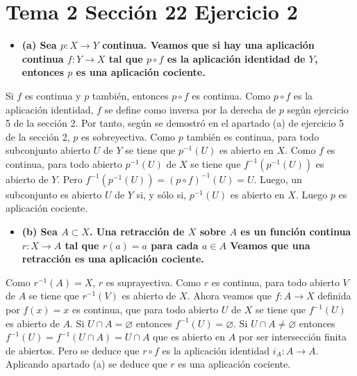 \documentclass{article}
\begin{document}
\section{Tema 2 Sección 22 Ejercicio 2}
\begin{itemize}
\item \bf (a) \rm Sea $p:X\rightarrow Y$ continua. Veamos que si hay una aplicación continua $f:Y\rightarrow X$ tal que $p\circ f$ es la aplicación identidad de $Y$, entonces $p$ es una aplicación cociente.
\end{itemize}
Si $f$ es continua y $p$ también, entonces $p\circ f$ es continua. Como $p\circ f$ es la aplicación identidad, $f$ se define como inversa por la derecha de $p$ según ejercicio 5 de la sección 2. Por tanto, según se demostró en el apartado (a) de ejercicio 5 de la sección 2, $p$ es sobreyectiva. Como $p$ también es continua, para todo subconjunto abierto $U$ de $Y$ se tiene que $p^{-1}(U)$ es abierto en $X$. Como $f$ es continua, para todo abierto $p^{-1}(U)$ de $X$ se tiene que $f^{-1}(p^{-1}(U))$ es abierto de $Y$. Pero $f^{-1}(p^{-1}(U))=(p\circ f)^{-1}(U)=U$. Luego, un subconjunto es abierto $U$ de $Y$ si, y sólo si, $p^{-1}(U)$ es abierto en $X$. Luego $p$ es aplicación cociente.
\begin{itemize}
\item \bf (b) \rm Sea $A\subset X$. Una retracción de $X$ sobre $A$ es un función continua $r:X\rightarrow A$ tal que $r(a)=a$ para cada $a\in A$ Veamos que una retracción es una aplicación cociente.
\end{itemize}
Como $r^{-1}(A)=X$, $r$ es suprayectiva. Como $r$ es continua, para todo abierto $V$ de $A$ se tiene que $r^{-1}(V)$ es abierto de $X$. Ahora veamos que $f:A\rightarrow X$ definida por $f(x)=x$ es continua, que para todo abierto $U$  de $X$ se tiene que $f^{-1}(U)$ es abierto de $A$. Si $U\cap A=\varnothing$ entonces $f^{-1}(U)=\varnothing$. Si $U\cap A\neq \varnothing$ entonces $f^{-1}(U)=f^{-1}(U\cap A)=U\cap A$ que es abierto en $A$ por ser intersección finita de abiertos. Pero se deduce que $r\circ f$ es la aplicación identidad $i_A:A\rightarrow A$. Aplicando apartado (a) se deduce que $r$ es una aplicación cociente.
\end{document}
